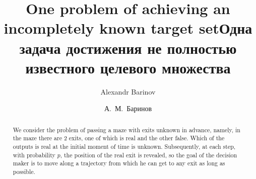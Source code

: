 \begin{englishtitle} %
\title{One problem of achieving an incompletely known target set}
\author{Alexandr Barinov}


\maketitle

\begin{abstract}
We consider the problem of passing a maze with exits unknown in advance, namely, in the maze there are $2$ exits, one of which is real and the other false. Which of the outputs is real at the initial moment of time is unknown. Subsequently, at each step, with probability $p$, the position of the real exit is revealed, so the goal of the decision maker is to move along a trajectory from which he can get to any exit as long as possible.

\end{abstract}
\end{englishtitle}

\iffalse
%
%


\documentclass[12pt]{llncs}


\usepackage{iftex}

\ifPDFTeX
\usepackage[T2A]{fontenc}
\usepackage[utf8]{inputenc} %
\usepackage[english,russian]{babel}
\fi

\usepackage{todonotes}

\usepackage[russian]{nla}


\fi

\title{Одна задача достижения не полностью известного целевого множества}%
\author{А.~М.~Баринов
}

